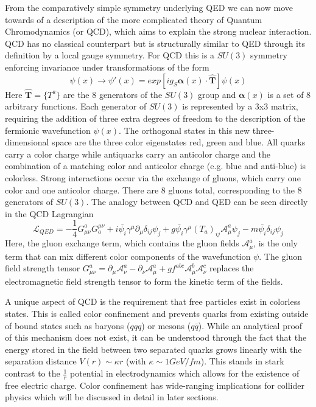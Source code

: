From the comparatively simple symmetry underlying QED we can now move towards of a description 
of the more complicated theory of Quantum Chromodynamics (or QCD), which aims to explain the strong nuclear 
interaction. QCD has no classical counterpart but is structurally similar to QED through its definition by a local 
gauge symmetry. For QCD this is a $SU(3)$ symmetry enforcing invariance under transformations of the form
\begin{equation}
\psi(x) \rightarrow \psi'(x) = exp[ig_{S} \boldsymbol{\alpha}(x) \cdot \boldsymbol{\hat{T}}] \psi(x)
\end{equation}
Here $\boldsymbol{\hat{T}} =  \{T^a\}$ are the 8 generators of the $SU(3)$ group and $\boldsymbol{\alpha}(x)$ is 
a set of 8 arbitrary functions. Each generator of $SU(3)$ is represented by a 3x3 matrix, requiring the addition of 
three extra degrees of freedom to the description of the fermionic wavefunction $\psi(x)$.  The orthogonal states in 
this new three-dimensional space are the three color eigenstates red, green and blue. All quarks carry a color charge 
while antiquarks carry an anticolor charge and the combination of a matching color and anticolor charge (e.g. blue and 
anti-blue) is colorless.  Strong interactions occur via the exchange of gluons, which carry one color and one anticolor 
charge. There are 8 gluons total, corresponding to the 8 generators of $SU(3)$. The analogy between QCD and QED can 
be seen directly in the QCD Lagrangian
\begin{equation}
\mathcal{L}_{QED} = 
- \frac{1}{4}G^a_{\mu\nu}G^{\mu\nu}_a + i\bar{\psi_i}\gamma^{\mu}\partial_{\mu}\delta_{ij}\psi_j +g\bar{\psi_i}\gamma^{\mu}(T_a)_{ij}\mathcal{A}^a_{\mu}\psi_j  - m\bar{\psi_i}\delta_{ij}\psi_j
\end{equation}
Here, the gluon exchange term, which contains the gluon fields $\mathcal{A}^a_{\mu}$, is the only term that can mix 
different color components of the wavefunction $\psi$. The gluon field strength tensor 
$G^a_{\mu\nu} = \partial_{\mu}\mathcal{A}^a_{\nu} - \partial_{\nu}\mathcal{A}^a_{\mu} + 
gf^{abc}\mathcal{A}^b_{\mu}\mathcal{A}^c_{\nu}$ replaces the electromagnetic field strength tensor to form the 
kinetic term of the fields. \par

A unique aspect of QCD is the requirement that free particles exist in colorless states. This is called color confinement 
and prevents quarks from existing outside of bound states such as baryons ($qqq$) or mesons ($q\bar{q}$). While an 
analytical proof of this mechanism does not exist, it can be understood through the fact that the energy stored in the 
field between two separated quarks grows linearly with the separation distance $V(r) \sim \kappa r$ (with 
$\kappa \sim 1 GeV/fm$). This stands in stark contrast to the $\frac{1}{r}$ potential in electrodynamics which allows 
for the existence of free electric charge. Color confinement has wide-ranging implications for collider physics which 
will be discussed in detail in later sections.

